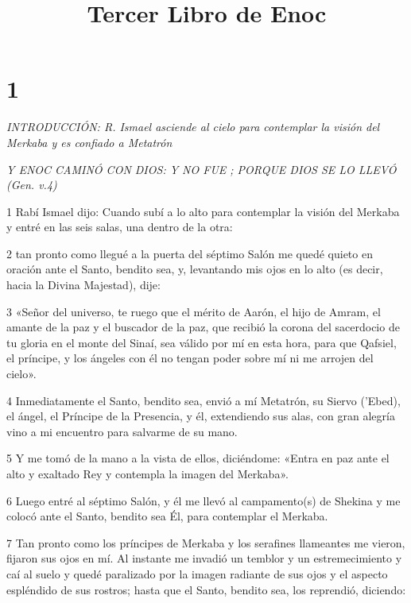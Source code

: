 

\title{Tercer Libro de Enoc}

\chapter{1}

\par \textit{INTRODUCCIÓN: R. Ismael asciende al cielo para contemplar la visión del Merkaba y es confiado a Metatrón}

\par \textit{Y ENOC CAMINÓ CON DIOS: Y NO FUE ; PORQUE DIOS SE LO LLEVÓ (Gen. v.4)}

\par 1 Rabí Ismael dijo: Cuando subí a lo alto para contemplar la visión del Merkaba y entré en las seis salas, una dentro de la otra:

\par 2 tan pronto como llegué a la puerta del séptimo Salón me quedé quieto en oración ante el Santo, bendito sea, y, levantando mis ojos en lo alto (es decir, hacia la Divina Majestad), dije:

\par 3 «Señor del universo, te ruego que el mérito de Aarón, el hijo de Amram, el amante de la paz y el buscador de la paz, que recibió la corona del sacerdocio de tu gloria en el monte del Sinaí, sea válido por mí en esta hora, para que Qafsiel, el príncipe, y los ángeles con él no tengan poder sobre mí ni me arrojen del cielo».

\par 4 Inmediatamente el Santo, bendito sea, envió a mí Metatrón, su Siervo ('Ebed), el ángel, el Príncipe de la Presencia, y él, extendiendo sus alas, con gran alegría vino a mi encuentro para salvarme de su mano.

\par 5 Y me tomó de la mano a la vista de ellos, diciéndome: «Entra en paz ante el alto y exaltado Rey y contempla la imagen del Merkaba».

\par 6 Luego entré al séptimo Salón, y él me llevó al campamento(s) de Shekina y me colocó ante el Santo, bendito sea Él, para contemplar el Merkaba.

\par 7 Tan pronto como los príncipes de Merkaba y los serafines llameantes me vieron, fijaron sus ojos en mí. Al instante me invadió un temblor y un estremecimiento y caí al suelo y quedé paralizado por la imagen radiante de sus ojos y el aspecto espléndido de sus rostros; hasta que el Santo, bendito sea, los reprendió, diciendo:


